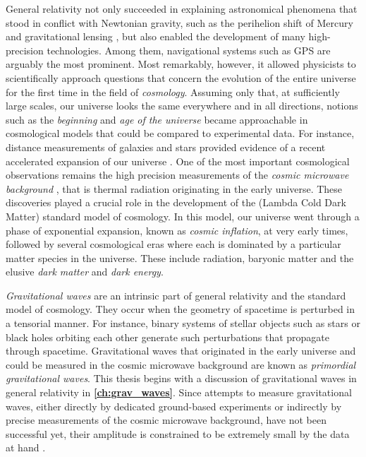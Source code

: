 General relativity not only succeeded in explaining astronomical phenomena that stood in conflict with Newtonian gravity, such as the perihelion shift of Mercury and gravitational lensing \autocite{Einstein1915Astro}, but also enabled the development of many high-precision technologies. Among them, navigational systems such as GPS are arguably the most prominent. Most remarkably, however, it allowed physicists to scientifically approach questions that concern the evolution of the entire universe for the first time in the field of \emph{cosmology}. Assuming only that, at sufficiently large scales, our universe looks the same everywhere and in all directions, notions such as the \emph{beginning} and \emph{age of the universe} became approachable in cosmological models that could be compared to experimental data. For instance, distance measurements of galaxies and stars provided evidence of a recent accelerated expansion of our universe \autocite{Perlmutter2003}. One of the most important cosmological observations remains the high precision measurements of the \emph{cosmic microwave background} \autocite{Penzias1965,Planck2015}, that is thermal radiation originating in the early universe. These discoveries played a crucial role in the development of the \LCDM{} (Lambda Cold Dark Matter) standard model of cosmology. In this model, our universe went through a phase of exponential expansion, known as \emph{cosmic inflation}, at very early times, followed by several cosmological eras where each is dominated by a particular matter species in the universe. These include radiation, baryonic matter and the elusive \emph{dark matter} and \emph{dark energy}.

\emph{Gravitational waves} are an intrinsic part of general relativity and the standard model of cosmology. They occur when the geometry of spacetime is perturbed in a tensorial manner. For instance, binary systems of stellar objects such as stars or black holes orbiting each other generate such perturbations that propagate through spacetime. Gravitational waves that originated in the early universe and could be measured in the cosmic microwave background are known as \emph{primordial gravitational waves}. This thesis begins with a discussion of gravitational waves in general relativity in \textbf{\autoref{ch:grav_waves}}. Since attempts to measure gravitational waves, either directly by dedicated ground-based experiments or indirectly by precise measurements of the cosmic microwave background, have not been successful yet, their amplitude is constrained to be extremely small by the data at hand \autocite{LIGO2009,Planck2015}.

